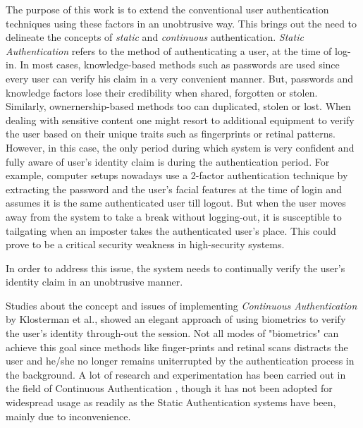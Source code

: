 \documentclass[12pt]{article}			%
\begin{document}
The purpose of this work is to extend the conventional user authentication techniques using these factors in an unobtrusive way.
This brings out the need to delineate the concepts of \emph{static} and \emph{continuous} authentication.
\emph{Static Authentication} refers to the method of authenticating a user, at the time of log-in. In most cases, knowledge-based methods such as passwords are used since every user can verify his claim in a very convenient manner. But, passwords and knowledge factors lose their credibility when shared, forgotten or stolen. Similarly, ownernership-based methods too can duplicated, stolen or lost.
When dealing with sensitive content one might resort to additional equipment to verify the user based on their unique traits such as fingerprints or retinal patterns. However, in this case, the only period during which system is very confident and fully aware of user's identity claim is during the authentication period.
For example, computer setups nowadays use a 2-factor authentication technique by extracting the password and the user's facial features at the time of login and assumes it is the same authenticated user till logout. But when the user moves away from the system to take a break without logging-out, it is susceptible to tailgating when an imposter takes the authenticated user's place. This could prove to be a critical security weakness in  high-security systems.

In order to address this issue, the system needs to continually verify the user's identity claim in an unobtrusive manner.

Studies about the concept and issues of implementing \emph{Continuous Authentication} by Klosterman et al.\cite{Klos00}, showed an elegant approach of using biometrics to verify the user's identity through-out the session. Not all modes of "biometrics" can achieve this goal since methods like finger-prints and retinal scans distracts the user and he/she no longer remains uniterrupted by the authentication process in the background.
A lot of research and experimentation has been carried out in the field of Continuous Authentication \cite{Niin10,Klos00,mon00,turk03,sim07,azz08,azz082}, though it has not been adopted for widespread usage as readily as the Static Authentication systems have been, mainly due to inconvenience.
\end{document}
